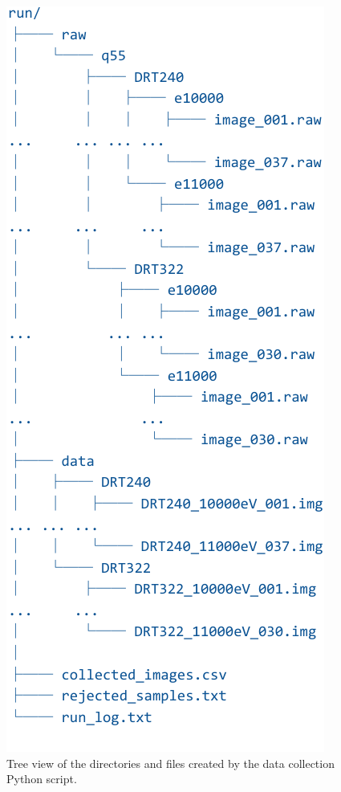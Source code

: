 \documentclass[letterpaper,twocolumn,10pt]{article}
\newcommand{\YW}{\textsf{YesWorkflow}}
\begin{document}
\begin{figure}[thb]
  \centering
  \includegraphics[width=.3\textwidth]{tree-abbrev-crop.pdf}
  \caption{\small Tree view of the directories and files created by
    the data collection Python script.}
  \label{fig-data-tree}
\end{figure}



\end{document}
